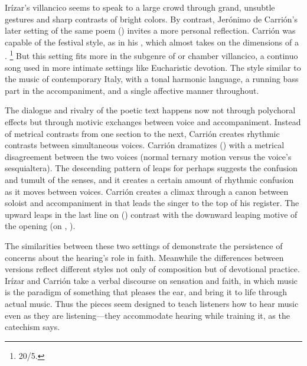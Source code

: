 Irízar's villancico seems to speak to a large crowd through grand, unsubtle 
gestures and sharp contrasts of bright colors.
By contrast, Jerónimo de Carrión's later setting of the same poem 
() invites a more personal 
reflection.%
    \Autocite{Cashner:SingingAboutSingingI}
Carrión was capable of the festival style, as in his , which almost takes on the dimensions of a .%
    \footnote{\signature{E-SE}{20/5}.}
But this setting fits more in the subgenre of  or chamber 
villancico, a continuo song used in more intimate settings like Eucharistic 
devotion.%
    \Autocite[See, for example,][]{Robledo:MadridTonos}
The style similar to the  music of contemporary Italy, 
with a tonal harmonic language, a running bass part in the accompaniment, and a 
single affective manner throughout.


The dialogue and rivalry of the poetic text happens now not through polychoral 
effects but through motivic exchanges between voice and accompaniment.
Instead of metrical contrasts from one section to the next, Carrión creates 
rhythmic contrasts between simultaneous voices.
Carrión dramatizes  () with a metrical 
disagreement between the two voices (normal ternary motion versus the voice's 
sesquialtera).
The descending pattern of leaps for  
perhaps suggests the confusion and tumult of the senses, and it creates a 
certain amount of rhythmic confusion as it moves between voices.
Carrión creates a climax through a canon between soloist and accompaniment in 
 that leads the singer to the top of his register.
The upward leaps in the last line on  () 
contrast with the downward leaping motive of the opening (on 
, ).

The similarities between these two settings of  
demonstrate the persistence of concerns about the hearing's role in faith.
Meanwhile the differences between versions reflect different styles not only of 
composition but of devotional practice.
Irízar and Carrión take a verbal discourse on sensation and faith, in which 
music is the paradigm of something that pleases the ear, and bring it to life 
through actual music.
Thus the pieces seem designed to teach listeners how to hear music even as they 
are listening---they accommodate hearing while training it, as the catechism 
says.


